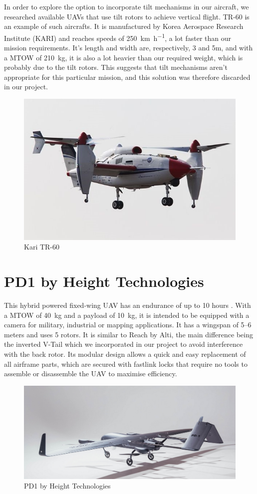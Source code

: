 \documentclass[english,fira]{ist-report}
\begin{document}
In order to explore the option to incorporate tilt mechanisms in our aircraft, we researched available UAVs that use tilt rotors to achieve vertical flight. TR-60 is an example of such aircrafts. It is manufactured by Korea Aerospace Research Institute (KARI) and reaches speeds of \SI{250}{\kilo\meter\per\hour}, a lot faster than our mission requirements.\cite{kari} It’s length and width are, respectively, 3 and 5m, and with a MTOW of \SI{210}{\kilo\gram}, it is also a lot heavier than our required weight, which is probably due to the tilt rotors. This suggests that tilt mechanisms aren’t appropriate for this particular mission, and this solution was therefore discarded in our project. 
\begin{figure}[ht]
    \centering
    \includegraphics[width = 0.6\linewidth]{graphics/MarketOverview/KARI.jpg}
    \caption{Kari TR-60}
    \label{fig:kari}
\end{figure}

\section{PD1 by Height Technologies}

This hybrid powered fixed-wing UAV has an endurance of up to 10 hours \cite{pd1}. With a MTOW of \SI{40}{\kilo\gram} and a payload of \SI{10}{\kilo\gram}, it is intended to be equipped with a camera for military, industrial or mapping applications. It has a wingspan of \numrange[range-phrase = --]{5}{6} meters and uses 5 rotors. It is similar to Reach by Alti, the main difference being the inverted V-Tail which we incorporated in our project to avoid interference with the back rotor. Its modular design allows a quick and easy replacement of all airframe parts, which are secured with fastlink locks that require no tools to assemble or disassemble the UAV to maximise efficiency. 

\begin{figure}[ht]
    \centering
    \includegraphics[width = 0.6\linewidth]{graphics/MarketOverview/pd1.png}
    \caption{PD1 by Height Technologies}
    \label{fig:pd1}
\end{figure}
\end{document}
